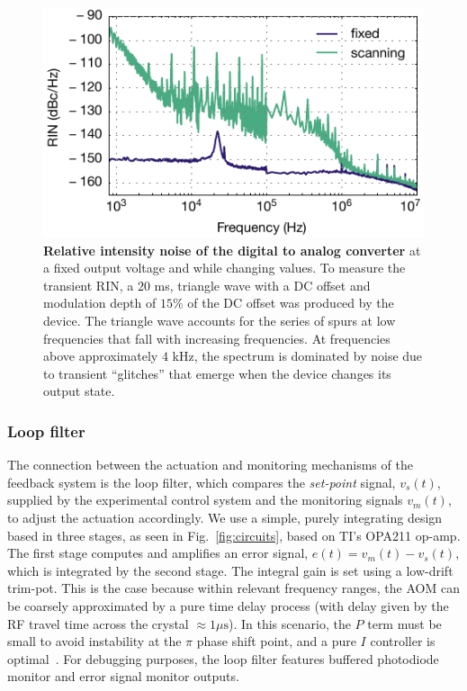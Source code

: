 \documentclass[twocolumn,aps,pra,showpacs,preprintnumbers,bibnotes]{revtex4-1}
\begin{document}
\begin{figure}
  \begin{center}
    \includegraphics{Figure9.pdf}
    \caption{\textbf{Relative intensity noise of the digital to analog converter} at a fixed output voltage and while changing values. To measure the transient RIN, a $20$ ms, triangle wave with a DC offset and modulation depth of $15$\% of the DC offset was produced by the device. The triangle wave accounts for the series of spurs at low frequencies that fall with increasing frequencies. At frequencies above approximately $4$ kHz, the spectrum is dominated by noise due to transient ``glitches'' that emerge when the device changes its output state.}\label{fig:da_rin}
  \end{center}
\end{figure}


\subsubsection{Loop filter}

The connection between the actuation and monitoring mechanisms of the feedback system is the loop filter, which compares the \textit{set-point} signal, $v_s(t)$, supplied by the experimental control system and the monitoring signals $v_m(t)$, to adjust the actuation accordingly.
We use a simple, purely integrating design based in three stages, as seen in Fig.~\ref{fig:circuits}, based on TI's OPA211 op-amp.
The first stage computes and amplifies an error signal, $e(t)=v_m(t)-v_s(t)$, which is integrated by the second stage.
The integral gain is set using a low-drift trim-pot.
This is the case because within relevant frequency ranges, the AOM can be coarsely approximated by a pure time delay process (with delay given by the RF travel time across the crystal $\approx 1 \mu\mathrm{s}$).
In this scenario, the $P$ term must be small to avoid instability at the $\pi$ phase shift point, and a pure $I$ controller is optimal~\cite{Skogestad2003}.
For debugging purposes, the loop filter features buffered photodiode monitor and error signal monitor outputs.
\end{document}
